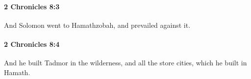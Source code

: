 		\paragraph{2 Chronicles 8:3} %
			\label{2CHRONICLES-8-3}

			And Solomon went to Hamathzobah, and prevailed against it.


		\paragraph{2 Chronicles 8:4} %
			\label{2CHRONICLES-8-4}

			And he built Tadmor in the wilderness, and all the store cities, which he built in Hamath.


